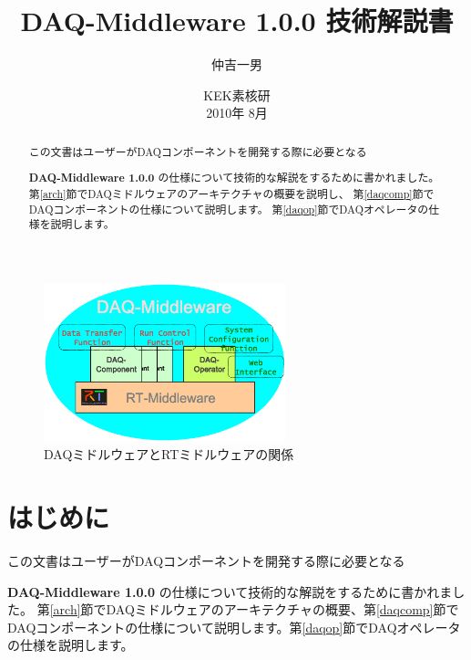 \documentclass[a4j,10pt,dvips,onecolumn,oneside,final]{jarticle}%
\newcommand {\daqmwcurrent} {
	{\bf DAQ-Middleware 1.0.0}
}
\begin{document}
\title{ \daqmwcurrent 技術解説書\\
}
\author{仲吉一男}
\date{
\vspace{0.1cm}
  KEK素核研\\
\vspace{0.4cm}
  2010年 8月 
}
\maketitle
\begin{abstract}
この文書はユーザーがDAQコンポーネントを開発する際に必要となる
 \daqmwcurrent の仕様について技術的な解説をするために書かれました。
第\ref{arch}節でDAQミドルウェアのアーキテクチャの概要を説明し、
第\ref{daqcomp}節でDAQコンポーネントの仕様について説明します。
第\ref{daqop}節でDAQオペレータの仕様を説明します。

\end{abstract}
{\rm }
\tableofcontents
\newpage

\begin{figure}
  \begin{center}
   \includegraphics[width=70mm]{daqmw-rtmw.eps}
  \end{center}
  \vspace{-7mm}
  \caption{\footnotesize DAQミドルウェアとRTミドルウェアの関係}
  \label{daqmw.fig}
\end{figure}

\section{はじめに}\label{intro}
この文書はユーザーがDAQコンポーネントを開発する際に必要となる
\daqmwcurrent の仕様について技術的な解説をするために書かれました。
第\ref{arch}節でDAQミドルウェアのアーキテクチャの概要、第\ref{daqcomp}節で
DAQコンポーネントの仕様について説明します。第\ref{daqop}節でDAQオペレータの仕様を説明します。
\end{document}
